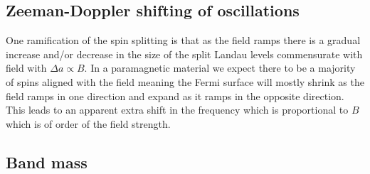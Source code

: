\subsection{Zeeman-Doppler shifting of oscillations}

One ramification of the spin splitting is that as the field ramps there is a gradual increase and/or decrease in the size of the split Landau levels commensurate with field with $\Delta a \propto B$. In a paramagnetic material we expect there to be a majority of spins aligned with the field meaning the Fermi surface will mostly shrink as the field ramps in one direction and expand as it ramps in the opposite direction. This leads to an apparent extra shift in the frequency which is proportional to $B$ which is of order of the field strength.


\subsection{Band mass}

